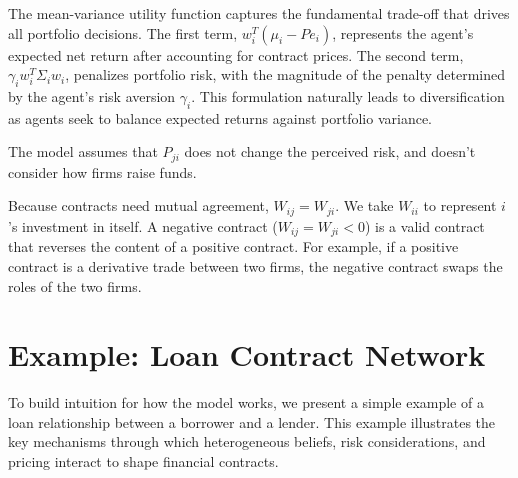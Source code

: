 The mean-variance utility function captures the fundamental trade-off that drives all portfolio decisions. The first term, $w_i^T(\mu_i - Pe_i)$, represents the agent's expected net return after accounting for contract prices. The second term, $\gamma_i w_i^T\Sigma_i w_i$, penalizes portfolio risk, with the magnitude of the penalty determined by the agent's risk aversion $\gamma_i$. This formulation naturally leads to diversification as agents seek to balance expected returns against portfolio variance.

The model assumes that $P_{ji}$ does not change the perceived risk, and doesn't consider how firms raise funds.

Because contracts need mutual agreement, $W_{ij} = W_{ji}$. We take $W_{ii}$ to represent $i$'s investment in itself. A negative contract ($W_{ij} = W_{ji} < 0$) is a valid contract that reverses the content of a positive contract. For example, if a positive contract is a derivative trade between two firms, the negative contract swaps the roles of the two firms.

\section{Example: Loan Contract Network}

To build intuition for how the model works, we present a simple example of a loan relationship between a borrower and a lender. This example illustrates the key mechanisms through which heterogeneous beliefs, risk considerations, and pricing interact to shape financial contracts.

